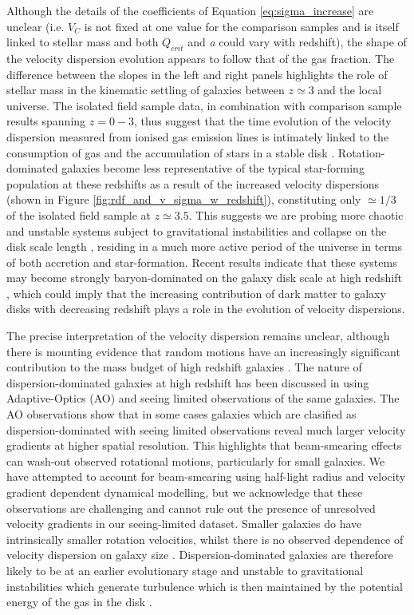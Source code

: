 \documentclass[fleqn,usenatbib]{mnras}
\begin{document}
\noindent
Although the details of the coefficients of Equation \ref{eq:sigma_increase} are unclear (i.e. $V_{C}$ is not fixed at one value for the comparison samples and is itself linked to stellar mass and both $Q_{crit}$ and {\it a} could vary with redshift), the shape of the velocity dispersion evolution appears to follow that of the gas fraction.
The difference between the slopes in the left and right panels highlights the role of stellar mass in the kinematic settling of galaxies between $z\simeq3$ and the local universe. 
The isolated field sample data, in combination with comparison sample results spanning $z=0-3$, thus suggest that the time evolution of the velocity dispersion measured from ionised gas emission lines is intimately linked to the consumption of gas and the accumulation of stars in a stable disk \citep[e.g.][]{Law2009,Law2012b,Law2012c,Wisnioski2015}.
Rotation-dominated galaxies become less representative of the typical star-forming population at these redshifts as a result of the increased velocity dispersions (shown in Figure \ref{fig:rdf_and_v_sigma_w_redshift}), constituting only $\simeq1/3$ of the isolated field sample at $z\simeq3.5$.
This suggests we are probing more chaotic and unstable systems subject to gravitational instabilities and collapse on the disk scale length \citep{Burkert2010,Genzel2011}, residing in a much more active period of the universe in terms of both accretion and star-formation.
Recent results indicate that these systems may become strongly baryon-dominated on the galaxy disk scale at high redshift \citep{Ubler2017,Lang2017,Genzel2017}, which could imply that the increasing contribution of dark matter to galaxy disks with decreasing redshift plays a role in the evolution of velocity dispersions.   

The precise interpretation of the velocity dispersion remains unclear, although there is mounting evidence that random motions have an increasingly significant contribution to the mass budget of high redshift galaxies \citep[e.g.][]{Kassin2007,Law2009,Burkert2010,Kassin2012,Wuyts2016b,Lang2017,Ubler2017,Genzel2017}.
The nature of dispersion-dominated galaxies at high redshift has been discussed in \cite{Newman2013} using Adaptive-Optics (AO) and seeing limited observations of the same galaxies.
The AO observations show that in some cases galaxies which are clasified as dispersion-dominated with seeing limited observations reveal much larger velocity gradients at higher spatial resolution.
This highlights that beam-smearing effects can wash-out observed rotational motions, particularly for small galaxies.
We have attempted to account for beam-smearing using half-light radius and velocity gradient dependent dynamical modelling, but we acknowledge that these observations are challenging and cannot rule out the presence of unresolved velocity gradients in our seeing-limited dataset.
Smaller galaxies do have intrinsically smaller rotation velocities, whilst there is no observed dependence of velocity dispersion on galaxy size \citep[e.g.][]{Newman2013}.
Dispersion-dominated galaxies are therefore likely to be at an earlier evolutionary stage and unstable to gravitational instabilities which generate turbulence which is then maintained by the potential energy of the gas in the disk \citep{Burkert2010,Newman2013}.
\end{document}
